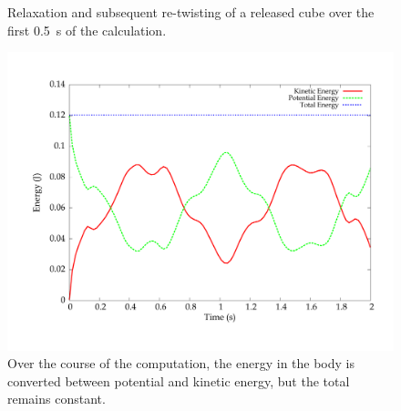 \begin{figure}
{    }
    \caption{Relaxation and subsequent re-twisting of a released cube
      over the first 0.5~s of the calculation.}
  \label{fig:narayanan:releasedcube}
\end{figure}

\begin{figure}
  \center\includegraphics[scale=10]{chapters/narayanan/images/pdf/energies.pdf}
  \caption{Over the course of the computation, the energy in the body
    is converted between potential and kinetic energy, but the total
    remains constant.}
    \label{fig:narayanan:energies}
\end{figure}

